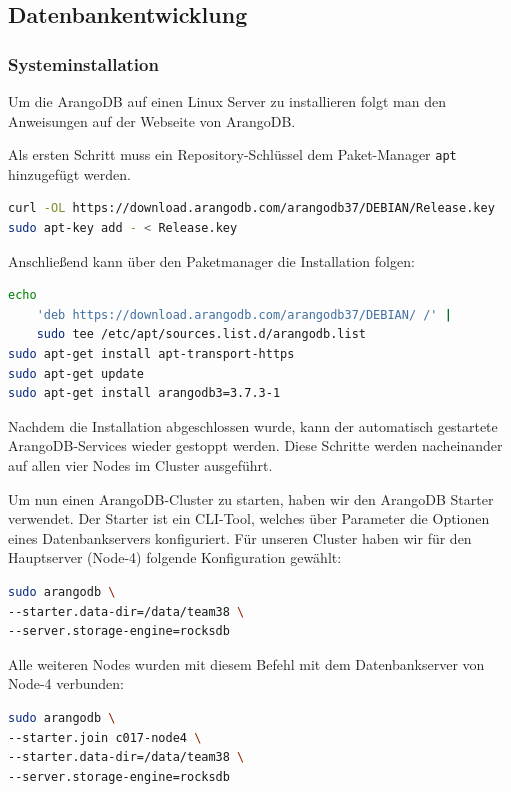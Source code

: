 \subsection{Datenbankentwicklung}
\subsubsection{Systeminstallation}
Um die ArangoDB auf einen Linux Server zu installieren folgt man den Anweisungen auf der Webseite von ArangoDB.

Als ersten Schritt muss ein Repository-Schlüssel dem Paket-Manager \texttt{apt} hinzugefügt werden.
\begin{lstlisting}[language=bash]
curl -OL https://download.arangodb.com/arangodb37/DEBIAN/Release.key
sudo apt-key add - < Release.key
\end{lstlisting}
Anschließend kann über den Paketmanager die Installation folgen:
\begin{lstlisting}[language=bash]
echo 
	'deb https://download.arangodb.com/arangodb37/DEBIAN/ /' | 
	sudo tee /etc/apt/sources.list.d/arangodb.list
sudo apt-get install apt-transport-https
sudo apt-get update
sudo apt-get install arangodb3=3.7.3-1
\end{lstlisting}
Nachdem die Installation abgeschlossen wurde, kann der automatisch gestartete ArangoDB-Services wieder gestoppt werden. Diese Schritte werden nacheinander auf allen vier Nodes im Cluster ausgeführt. \cite{ADB_install}

Um nun einen ArangoDB-Cluster zu starten, haben wir den ArangoDB Starter verwendet. Der Starter ist ein \ac{CLI}-Tool, welches über Parameter die Optionen eines Datenbankservers konfiguriert. 
Für unseren Cluster haben wir für den Hauptserver (Node-4) folgende Konfiguration gewählt:
\begin{lstlisting}[language=bash]
sudo arangodb \
--starter.data-dir=/data/team38 \
--server.storage-engine=rocksdb
\end{lstlisting}
Alle weiteren Nodes wurden mit diesem Befehl mit dem Datenbankserver von Node-4 verbunden:
\begin{lstlisting}[language=sh]
sudo arangodb \
--starter.join c017-node4 \
--starter.data-dir=/data/team38 \
--server.storage-engine=rocksdb
\end{lstlisting}
\citep{ADB_starter}


